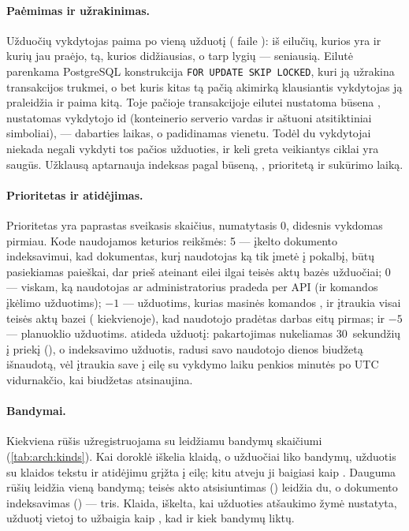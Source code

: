 \paragraph{Paėmimas ir užrakinimas.} Užduočių vykdytojas paima po vieną užduotį (
faile ): iš eilučių, kurios yra  ir kurių 
jau praėjo, tą, kurios  didžiausias, o tarp lygių --- seniausią. Eilutė
parenkama PostgreSQL konstrukcija \texttt{FOR UPDATE SKIP LOCKED}, kuri ją užrakina
transakcijos trukmei, o bet kuris kitas tą pačią akimirką klausiantis vykdytojas ją praleidžia
ir paima kitą. Toje pačioje transakcijoje eilutei nustatoma būsena ,
 nustatomas vykdytojo id (konteinerio serverio vardas ir aštuoni atsitiktiniai
simboliai),  --- dabarties laikas, o  padidinamas vienetu.
Todėl du vykdytojai niekada negali vykdyti tos pačios užduoties, ir keli greta veikiantys
ciklai yra saugūs. Užklausą aptarnauja indeksas pagal būseną, , prioritetą ir
sukūrimo laiką.

\paragraph{Prioritetas ir atidėjimas.} Prioritetas yra paprastas sveikasis skaičius,
numatytasis 0, didesnis vykdomas pirmiau. Kode naudojamos keturios reikšmės: 5 --- įkelto
dokumento indeksavimui, kad dokumentas, kurį naudotojas ką tik įmetė į pokalbį, būtų
pasiekiamas paieškai, dar prieš ateinant eilei ilgai teisės aktų bazės užduočiai; 0 --- viskam, ką
naudotojas ar administratorius pradeda per API (ir komandos  įkėlimo
užduotims); $-1$ --- užduotims, kurias masinės komandos ,
 ir  įtraukia visai teisės aktų bazei
( kiekvienoje), kad naudotojo pradėtas darbas eitų pirmas; ir $-5$ ---
planuoklio užduotims.  atideda užduotį: pakartojimas nukeliamas 30~sekundžių
į priekį (), o indeksavimo užduotis, radusi savo naudotojo dienos biudžetą
išnaudotą, vėl įtraukia save į eilę su vykdymo laiku penkios minutės po UTC vidurnakčio, kai biudžetas
atsinaujina.

\paragraph{Bandymai.} Kiekviena rūšis užregistruojama su leidžiamu bandymų skaičiumi
(\cref{tab:arch:kinds}). Kai doroklė iškelia klaidą, o užduočiai liko bandymų, užduotis su
klaidos tekstu ir atidėjimu grįžta į eilę; kitu atveju ji baigiasi kaip .
Dauguma rūšių leidžia vieną bandymą; teisės akto atsisiuntimas () leidžia
du, o dokumento indeksavimas () --- tris. Klaida, iškelta, kai užduoties
atšaukimo žymė nustatyta, užduotį vietoj to užbaigia kaip , kad ir kiek
bandymų liktų.

